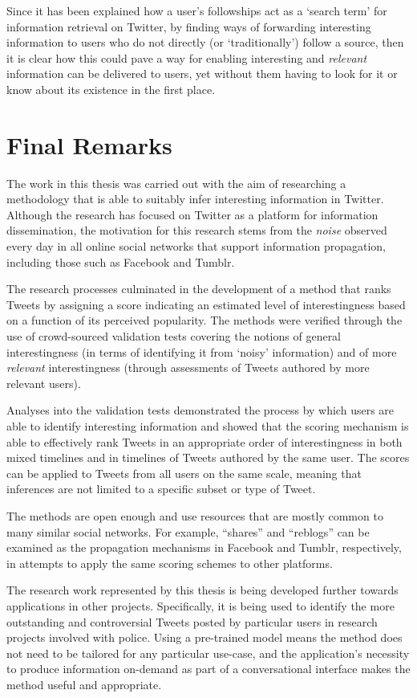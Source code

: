 Since it has been explained how a user's followships act as a `search term' for information retrieval on Twitter, by finding ways of forwarding interesting information to users who do not directly (or `traditionally') follow a source, then it is clear how this could pave a way for enabling interesting and \textit{relevant} information can be delivered to users, yet without them having to look for it or know about its existence in the first place.


\section{Final Remarks}
The work in this thesis was carried out with the aim of researching a methodology that is able to suitably infer interesting information in Twitter. Although the research has focused on Twitter as a platform for information dissemination, the motivation for this research stems from the \textit{noise} observed every day in all online social networks that support information propagation, including those such as Facebook and Tumblr.

The research processes culminated in the development of a method that ranks Tweets by assigning a score indicating an estimated level of interestingness based on a function of its perceived popularity. The methods were verified through the use of crowd-sourced validation tests covering the notions of general interestingness (in terms of identifying it from `noisy' information) and of more \textit{relevant} interestingness (through assessments of Tweets authored by more relevant users).

Analyses into the validation tests demonstrated the process by which users are able to identify interesting information and showed that the scoring mechanism is able to effectively rank Tweets in an appropriate order of interestingness in both mixed timelines and in timelines of Tweets authored by the same user. The scores can be applied to Tweets from all users on the same scale, meaning that inferences are not limited to a specific subset or type of Tweet.

The methods are open enough and use resources that are mostly common to many similar social networks. For example, ``shares'' and ``reblogs'' can be examined as the propagation mechanisms in Facebook and Tumblr, respectively, in attempts to apply the same scoring schemes to other platforms.

The research work represented by this thesis is being developed further towards applications in other projects. Specifically, it is being used to identify the more outstanding and controversial Tweets posted by particular users in research projects involved with police. Using a pre-trained model means the method does not need to be tailored for any particular use-case, and the application's necessity to produce information on-demand as part of a conversational interface makes the method useful and appropriate.
